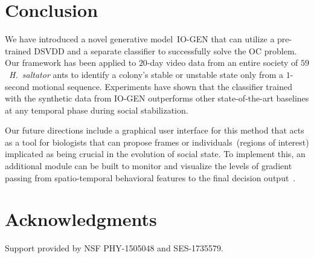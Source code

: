 \documentclass[letterpaper]{article} %
\begin{document}

\section{Conclusion}
\label{sec:conclusion}

We have introduced a novel generative model~\mbox{IO-GEN} that can utilize
a pre-trained DSVDD and a separate classifier to successfully
solve the OC problem. Our framework has been applied to $20$-day
video data from an entire society of $59$~\emph{H.~saltator} 
ants to identify a colony's stable or unstable state only from a 
$1$-second motional sequence. Experiments have shown that the 
classifier trained with the synthetic data from \mbox{IO-GEN} outperforms 
other state-of-the-art baselines at any temporal phase during social 
stabilization.

Our future directions include a graphical user interface for
this method that acts as a tool for biologists that can propose 
frames or individuals~(regions of interest) implicated 
as being crucial in the evolution of social state. 
To implement this, an additional module can be built to monitor and 
visualize the levels of gradient passing from spatio-temporal behavioral 
features to the final decision output~\citep{Choi2020PhDThesis}.

\section{Acknowledgments}
\label{sec:acknowledgements}

Support provided by NSF PHY-1505048 and SES-1735579.

 
\end{document}
